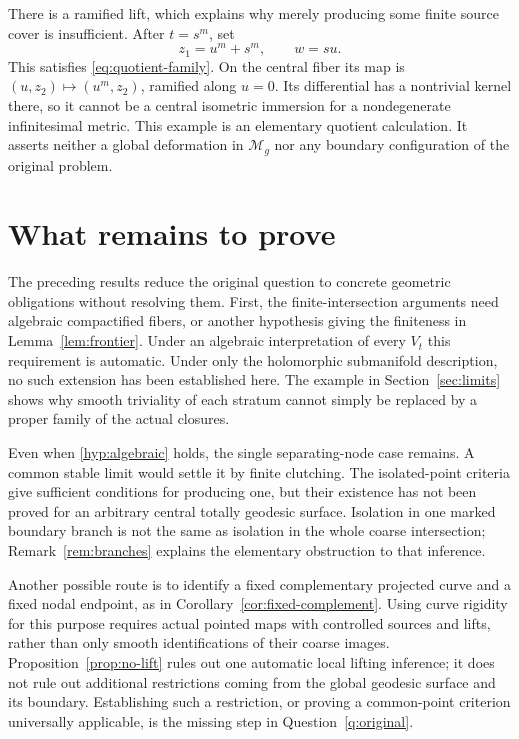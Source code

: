\documentclass[11pt]{article}
\newcommand{\M}{\mathcal M}
\theoremstyle{definition}
\theoremstyle{remark}
\begin{document}
There is a ramified lift, which explains why merely producing some finite source cover is insufficient. After $t=s^m$, set
\[
 z_1=u^m+s^m,\qquad w=su.
\]
This satisfies \eqref{eq:quotient-family}. On the central fiber its map is $(u,z_2)\mapsto(u^m,z_2)$, ramified along $u=0$. Its differential has a nontrivial kernel there, so it cannot be a central isometric immersion for a nondegenerate infinitesimal metric. This example is an elementary quotient calculation. It asserts neither a global deformation in $\M_g$ nor any boundary configuration of the original problem.

\section{What remains to prove}

The preceding results reduce the original question to concrete geometric obligations without resolving them. First, the finite-intersection arguments need algebraic compactified fibers, or another hypothesis giving the finiteness in Lemma~\ref{lem:frontier}. Under an algebraic interpretation of every $V_t$ this requirement is automatic. Under only the holomorphic submanifold description, no such extension has been established here. The example in Section~\ref{sec:limits} shows why smooth triviality of each stratum cannot simply be replaced by a proper family of the actual closures.

Even when \eqref{hyp:algebraic} holds, the single separating-node case remains. A common stable limit would settle it by finite clutching. The isolated-point criteria give sufficient conditions for producing one, but their existence has not been proved for an arbitrary central totally geodesic surface. Isolation in one marked boundary branch is not the same as isolation in the whole coarse intersection; Remark~\ref{rem:branches} explains the elementary obstruction to that inference.

Another possible route is to identify a fixed complementary projected curve and a fixed nodal endpoint, as in Corollary~\ref{cor:fixed-complement}. Using curve rigidity for this purpose requires actual pointed maps with controlled sources and lifts, rather than only smooth identifications of their coarse images. Proposition~\ref{prop:no-lift} rules out one automatic local lifting inference; it does not rule out additional restrictions coming from the global geodesic surface and its boundary. Establishing such a restriction, or proving a common-point criterion universally applicable, is the missing step in Question~\ref{q:original}.
\end{document}
